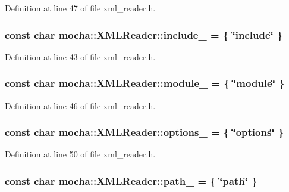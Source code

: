 Definition at line 47 of file xml\_\-reader.h.

\hypertarget{classmocha_1_1_x_m_l_reader_ad1a6dff4c5b1c8d3c697f7759022c4b5}{
\subsubsection[{include\_\-}]{\setlength{\rightskip}{0pt plus 5cm}const char {\bf mocha::XMLReader::include\_\-} = \{ \char`\"{}include\char`\"{} \}}}
\label{classmocha_1_1_x_m_l_reader_ad1a6dff4c5b1c8d3c697f7759022c4b5}


Definition at line 43 of file xml\_\-reader.h.

\hypertarget{classmocha_1_1_x_m_l_reader_a791eea80c3f0c419f6582c87b2a9b631}{
\subsubsection[{module\_\-}]{\setlength{\rightskip}{0pt plus 5cm}const char {\bf mocha::XMLReader::module\_\-} = \{ \char`\"{}module\char`\"{} \}}}
\label{classmocha_1_1_x_m_l_reader_a791eea80c3f0c419f6582c87b2a9b631}


Definition at line 46 of file xml\_\-reader.h.

\hypertarget{classmocha_1_1_x_m_l_reader_ae72442abf51c27715281622f68e6f238}{
\subsubsection[{options\_\-}]{\setlength{\rightskip}{0pt plus 5cm}const char {\bf mocha::XMLReader::options\_\-} = \{ \char`\"{}options\char`\"{} \}}}
\label{classmocha_1_1_x_m_l_reader_ae72442abf51c27715281622f68e6f238}


Definition at line 50 of file xml\_\-reader.h.

\hypertarget{classmocha_1_1_x_m_l_reader_a8b2209cc78c1b2c380fc77e8663c3677}{
\subsubsection[{path\_\-}]{\setlength{\rightskip}{0pt plus 5cm}const char {\bf mocha::XMLReader::path\_\-} = \{ \char`\"{}path\char`\"{} \}}}
\label{classmocha_1_1_x_m_l_reader_a8b2209cc78c1b2c380fc77e8663c3677}


